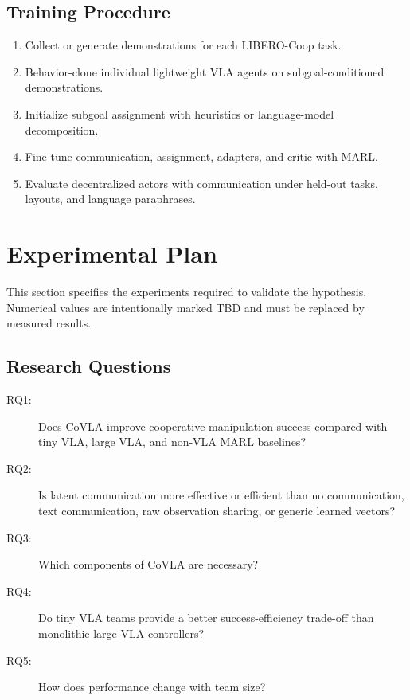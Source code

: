 \documentclass[11pt]{article}
\newcommand{\method}{CoVLA}
\newcommand{\liberocoop}{LIBERO-Coop}
\begin{document}
\subsection{Training Procedure}
\begin{enumerate}
    \item Collect or generate demonstrations for each \liberocoop{} task.
    \item Behavior-clone individual lightweight VLA agents on subgoal-conditioned demonstrations.
    \item Initialize subgoal assignment with heuristics or language-model decomposition.
    \item Fine-tune communication, assignment, adapters, and critic with MARL.
    \item Evaluate decentralized actors with communication under held-out tasks, layouts, and language paraphrases.
\end{enumerate}

\section{Experimental Plan}

This section specifies the experiments required to validate the hypothesis. Numerical values are intentionally marked TBD and must be replaced by measured results.

\subsection{Research Questions}
\begin{description}
    \item[RQ1:] Does \method{} improve cooperative manipulation success compared with tiny VLA, large VLA, and non-VLA MARL baselines?
    \item[RQ2:] Is latent communication more effective or efficient than no communication, text communication, raw observation sharing, or generic learned vectors?
    \item[RQ3:] Which components of \method{} are necessary?
    \item[RQ4:] Do tiny VLA teams provide a better success-efficiency trade-off than monolithic large VLA controllers?
    \item[RQ5:] How does performance change with team size?
\end{description}
\end{document}

